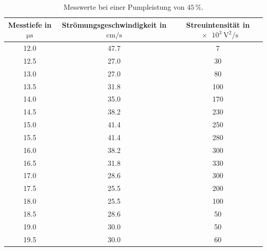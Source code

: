 \begin{table}
    \centering
    \caption{Messwerte bei einer Pumpleistung von $45\,\%$.}
    \label{tab:45percent}
    \begin{tabular}{c c c}
        \toprule
        Messtiefe in $\si{\micro\second}$ & Strömungsgeschwindigkeit in $\si{\centi\meter\per\second}$ & Streuintensität in $\SI{e3}{\volt\squared\per\second}$ \\
        \midrule
        12.0 & 47.7 &   7 \\
        12.5 & 27.0 &  30 \\
        13.0 & 27.0 &  80 \\
        13.5 & 31.8 & 100 \\
        14.0 & 35.0 & 170 \\
        14.5 & 38.2 & 230 \\
        15.0 & 41.4 & 250 \\
        15.5 & 41.4 & 280 \\
        16.0 & 38.2 & 300 \\
        16.5 & 31.8 & 330 \\
        17.0 & 28.6 & 300 \\
        17.5 & 25.5 & 200 \\
        18.0 & 25.5 & 100 \\
        18.5 & 28.6 &  50 \\
        19.0 & 30.0 &  50 \\
        19.5 & 30.0 &  60 \\
        \bottomrule
    \end{tabular}
\end{table}

